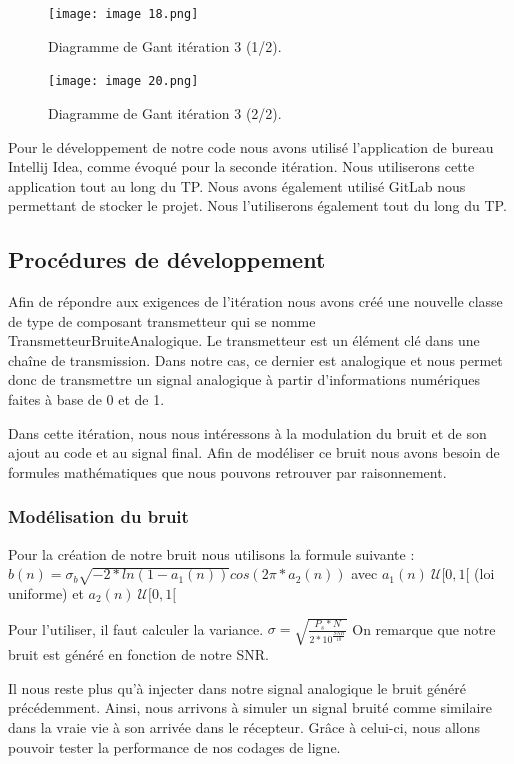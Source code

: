 \begin{figure}[H]
\centering
\texttt{[image: image 18.png]}
\caption{\label{fig:image18}Diagramme de Gant itération 3 (1/2).}
\end{figure}
\begin{figure}[H]
\centering
\texttt{[image: image 20.png]}
\caption{\label{fig:image20}Diagramme de Gant itération 3 (2/2).}
\end{figure}

Pour le développement de notre code nous avons utilisé l'application de bureau Intellij Idea, comme évoqué pour la seconde itération. Nous utiliserons cette application tout au long du TP. Nous avons également utilisé GitLab nous permettant de stocker le projet. Nous l'utiliserons également tout du long du TP.

\subsection{Procédures de développement}

Afin de répondre aux exigences de l'itération nous avons créé une nouvelle classe de type de composant transmetteur qui se nomme TransmetteurBruiteAnalogique. Le transmetteur est un élément clé dans une chaîne de transmission. Dans notre cas, ce dernier est analogique et nous permet donc de transmettre un signal analogique à partir d'informations numériques faites à base de 0 et de 1.

Dans cette itération, nous nous intéressons à la modulation du bruit et de son ajout au code et au signal final. Afin de modéliser ce bruit nous avons besoin de formules mathématiques que nous pouvons retrouver par raisonnement.

\subsubsection{Modélisation du bruit}
Pour la création de notre bruit nous utilisons la formule suivante :
$b(n) = \sigma_b\sqrt{-2*ln(1-a_1 (n))}cos(2\pi*a_2 (n))$ avec $a_1 (n) ~ \mathcal{U}[0,1[$ (loi uniforme) et $a_2 (n) ~ \mathcal{U}[0,1[$

Pour l'utiliser, il faut calculer la variance.
$\sigma = \sqrt{\frac{P_s*N}{2*10^{\frac{SNR}{10}}}}$
On remarque que notre bruit est généré en fonction de notre SNR.

Il nous reste plus qu'à injecter dans notre signal analogique le bruit généré précédemment. Ainsi, nous arrivons à simuler un signal bruité comme similaire dans la vraie vie à son arrivée dans le récepteur. Grâce à celui-ci, nous allons pouvoir tester la performance de nos codages de ligne.

